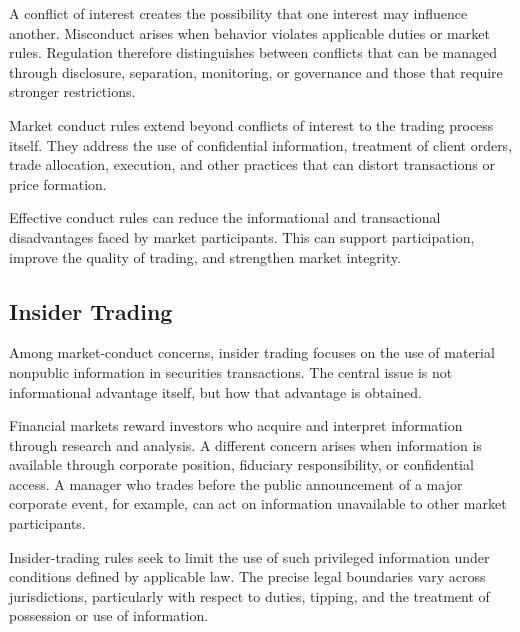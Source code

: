 \begin{tcolorbox}[
enhanced,
breakable,
colback=white,
colframe=FinanceBlue,
boxrule=0.7pt,
sharp corners,
borderline west={2.2pt}{0pt}{FinanceBlue},
title=\textbf{Financial Perspective: A Conflict Is Not the Same as Misconduct},
coltitle=white,
colbacktitle=FinanceBlue,
fonttitle=\bfseries,
before skip=1.2em,
after skip=1.2em
]

A conflict of interest creates the possibility that one interest may influence another. Misconduct arises when behavior violates applicable duties or market rules. Regulation therefore distinguishes between conflicts that can be managed through disclosure, separation, monitoring, or governance and those that require stronger restrictions.

\end{tcolorbox}


Market conduct rules extend beyond conflicts of interest to the trading process itself. They address the use of confidential information, treatment of client orders, trade allocation, execution, and other practices that can distort transactions or price formation.

Effective conduct rules can reduce the informational and transactional disadvantages faced by market participants. This can support participation, improve the quality of trading, and strengthen market integrity.


\subsection{Insider Trading}

Among market-conduct concerns, insider trading focuses on the use of material nonpublic information in securities transactions. The central issue is not informational advantage itself, but how that advantage is obtained.

Financial markets reward investors who acquire and interpret information through research and analysis. A different concern arises when information is available through corporate position, fiduciary responsibility, or confidential access. A manager who trades before the public announcement of a major corporate event, for example, can act on information unavailable to other market participants.

Insider-trading rules seek to limit the use of such privileged information under conditions defined by applicable law. The precise legal boundaries vary across jurisdictions, particularly with respect to duties, tipping, and the treatment of possession or use of information.

